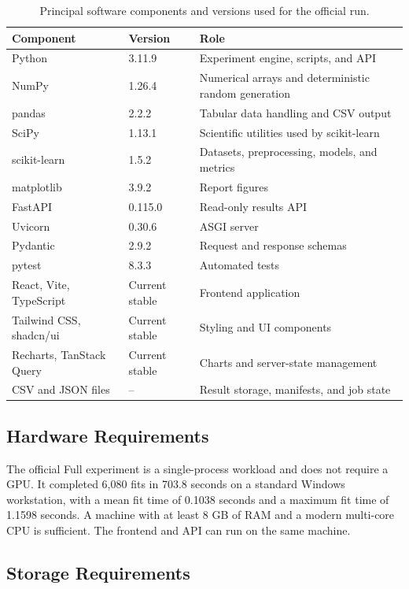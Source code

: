 \begin{table}[H]
\centering
\caption{Principal software components and versions used for the official run.}
\label{tab:software}
\small
\begin{tabular}{p{4.0cm}p{3.4cm}p{5.6cm}}
\toprule
\textbf{Component} & \textbf{Version} & \textbf{Role} \\
\midrule
Python & 3.11.9 & Experiment engine, scripts, and API \\
NumPy & 1.26.4 & Numerical arrays and deterministic random generation \\
pandas & 2.2.2 & Tabular data handling and CSV output \\
SciPy & 1.13.1 & Scientific utilities used by scikit-learn \\
scikit-learn & 1.5.2 & Datasets, preprocessing, models, and metrics \\
matplotlib & 3.9.2 & Report figures \\
FastAPI & 0.115.0 & Read-only results API \\
Uvicorn & 0.30.6 & ASGI server \\
Pydantic & 2.9.2 & Request and response schemas \\
pytest & 8.3.3 & Automated tests \\
React, Vite, TypeScript & Current stable & Frontend application \\
Tailwind CSS, shadcn/ui & Current stable & Styling and UI components \\
Recharts, TanStack Query & Current stable & Charts and server-state management \\
CSV and JSON files & -- & Result storage, manifests, and job state \\
\bottomrule
\end{tabular}
\end{table}

\subsection{Hardware Requirements}

The official Full experiment is a single-process workload and does not require a GPU. It completed 6,080 fits in 703.8 seconds on a standard Windows workstation, with a mean fit time of 0.1038 seconds and a maximum fit time of 1.1598 seconds. A machine with at least 8 GB of RAM and a modern multi-core CPU is sufficient. The frontend and API can run on the same machine.

\subsection{Storage Requirements}

